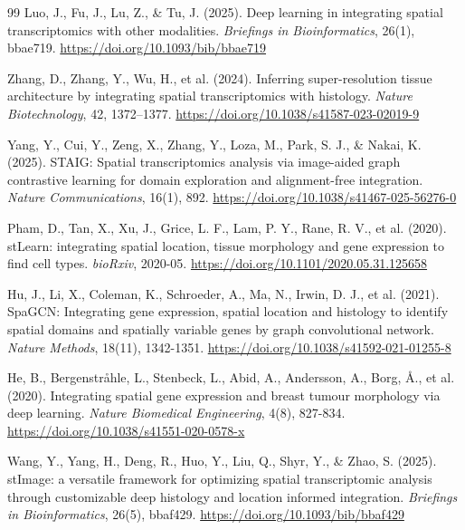 \documentclass[11pt, a4paper]{article}
\begin{document}
\begin{thebibliography}{99}
 Luo, J., Fu, J., Lu, Z., \& Tu, J. (2025). Deep learning in integrating spatial transcriptomics with other modalities. \textit{Briefings in Bioinformatics}, 26(1), bbae719. \href{https://doi.org/10.1093/bib/bbae719}{https://doi.org/10.1093/bib/bbae719}

 Zhang, D., Zhang, Y., Wu, H., et al. (2024). Inferring super-resolution tissue architecture by integrating spatial transcriptomics with histology. \textit{Nature Biotechnology}, 42, 1372–1377. \href{https://doi.org/10.1038/s41587-023-02019-9}{https://doi.org/10.1038/s41587-023-02019-9}

 Yang, Y., Cui, Y., Zeng, X., Zhang, Y., Loza, M., Park, S. J., \& Nakai, K. (2025). STAIG: Spatial transcriptomics analysis via image-aided graph contrastive learning for domain exploration and alignment-free integration. \textit{Nature Communications}, 16(1), 892. \href{https://doi.org/10.1038/s41467-025-56276-0}{https://doi.org/10.1038/s41467-025-56276-0}

 Pham, D., Tan, X., Xu, J., Grice, L. F., Lam, P. Y., Rane, R. V., et al. (2020). stLearn: integrating spatial location, tissue morphology and gene expression to find cell types. \textit{bioRxiv}, 2020-05. \href{https://doi.org/10.1101/2020.05.31.125658}{https://doi.org/10.1101/2020.05.31.125658}

 Hu, J., Li, X., Coleman, K., Schroeder, A., Ma, N., Irwin, D. J., et al. (2021). SpaGCN: Integrating gene expression, spatial location and histology to identify spatial domains and spatially variable genes by graph convolutional network. \textit{Nature Methods}, 18(11), 1342-1351. \href{https://doi.org/10.1038/s41592-021-01255-8}{https://doi.org/10.1038/s41592-021-01255-8}

 He, B., Bergenstråhle, L., Stenbeck, L., Abid, A., Andersson, A., Borg, Å., et al. (2020). Integrating spatial gene expression and breast tumour morphology via deep learning. \textit{Nature Biomedical Engineering}, 4(8), 827-834. \href{https://doi.org/10.1038/s41551-020-0578-x}{https://doi.org/10.1038/s41551-020-0578-x}

 Wang, Y., Yang, H., Deng, R., Huo, Y., Liu, Q., Shyr, Y., \& Zhao, S. (2025). stImage: a versatile framework for optimizing spatial transcriptomic analysis through customizable deep histology and location informed integration. \textit{Briefings in Bioinformatics}, 26(5), bbaf429. \href{https://doi.org/10.1093/bib/bbaf429}{https://doi.org/10.1093/bib/bbaf429}


\end{thebibliography}
\end{document}
